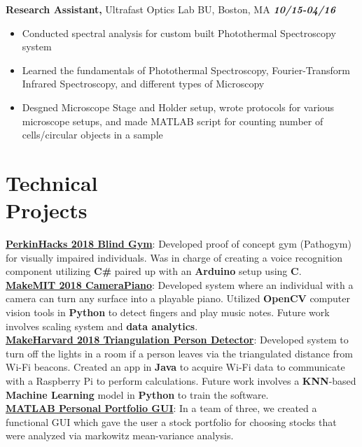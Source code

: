 \documentclass[margin]{res}
\begin{document}
\begin{resume}
{\bf Research Assistant,} Ultrafast Optics Lab BU, Boston, MA \hfill \textbf{\textit{10/15-04/16}}
			\begin{itemize} \itemsep -2pt
			\item  Conducted spectral analysis for custom built Photothermal Spectroscopy system
			\item Learned the fundamentals of Photothermal Spectroscopy, Fourier-Transform Infrared Spectroscopy, and different types of Microscopy 
			\item Desgned Microscope Stage and Holder setup, wrote protocols for various microscope setups, and made MATLAB script for counting number of cells/circular objects in a sample
			\end{itemize}
			
\section{Technical \\ Projects} 
\textbf{\underline{PerkinHacks 2018 Blind Gym}}: Developed proof of concept gym (Pathogym) for visually impaired individuals. Was in charge of creating a voice recognition component utilizing \textbf{C\#} paired up with an \textbf{Arduino} setup using \textbf{C}. \\
\textbf{\underline{MakeMIT 2018 CameraPiano}}: Developed system where an individual with a camera can turn any surface into a playable piano. Utilized \textbf{OpenCV} computer vision tools in \textbf{Python} to detect fingers and play music notes. Future work involves scaling system and \textbf{data analytics}.\\
\textbf{\underline{MakeHarvard 2018 Triangulation Person Detector}}: Developed system to turn off the lights in a room if a person leaves via the triangulated distance from Wi-Fi beacons. Created an app in \textbf{Java} to acquire Wi-Fi data to communicate with a Raspberry Pi to perform calculations. Future work involves a \textbf{KNN}-based \textbf{Machine Learning} model in \textbf{Python} to train the software. \\
\textbf{\underline{MATLAB Personal Portfolio GUI}}: In a team of three, we created a functional GUI which gave the user a stock portfolio for choosing stocks that were analyzed via markowitz mean-variance analysis. 			
			
			
			
			
			

\end{resume}
\end{document}
